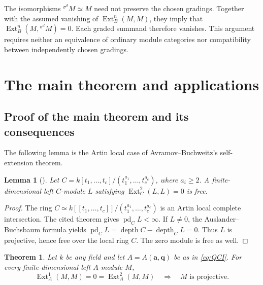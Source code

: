 \documentclass[10pt,a4paper]{amsart}
\numberwithin{equation}{section}
\newtheorem{theorem}[definition]{Theorem}
\newtheorem{lemma}[definition]{Lemma}
\DeclareMathOperator{\Ext}{Ext}
\DeclareMathOperator{\pd}{pd}
\DeclareMathOperator{\depth}{depth}
\newcommand{\tw}[2]{{}^{#1}\!#2}
\begin{document}
The isomorphisms \(\tw{\sigma^d}{M}\simeq M\) need not preserve
the chosen gradings. Together with the assumed vanishing of
\(\Ext_B^n(M,M)\), they imply that
\(\Ext_B^n(M,\tw{\sigma^d}{M})=0\).
Each graded summand therefore vanishes.
This argument requires neither an equivalence of ordinary module
categories nor compatibility between independently chosen gradings.

\section{The main theorem and applications}\label{sec:main}

\subsection{Proof of the main theorem and its consequences}

The following lemma is the Artin local case of
Avramov--Buchweitz's self-extension theorem.

\begin{lemma}[{\cite[Theorem 4.2]{AB00}}]\label{lem:commutative}
Let \(C=k[t_1,\ldots,t_c]/(t_1^{a_1},\ldots,t_c^{a_c})\), where
\(a_i\geq2\). A finite-dimensional left \(C\)-module \(L\) satisfying
\(\Ext_C^2(L,L)=0\) is free.
\end{lemma}

\begin{proof}
The ring \(C\simeq k[[t_1,\ldots,t_c]]/(t_1^{a_1},\ldots,t_c^{a_c})\)
is an Artin local complete intersection. The cited theorem gives
\(\pd_C L<\infty\). If \(L\ne0\), the Auslander--Buchsbaum formula yields
\(\pd_C L=\depth C-\depth_C L=0\). Thus \(L\) is projective, hence free
over the local ring \(C\). The zero module is free as well.
\end{proof}


\begin{theorem}\label{thm:main}
Let \(k\) be any field and let \(A=A(\mathbf a,\mathbf q)\) be as in
\eqref{eq:QCI}. For every finite-dimensional left \(A\)-module \(M\),
\[
 \Ext_A^1(M,M)=0=\Ext_A^2(M,M)
 \quad\Longrightarrow\quad M\text{ is projective}.
\]
\end{theorem}
\end{document}
